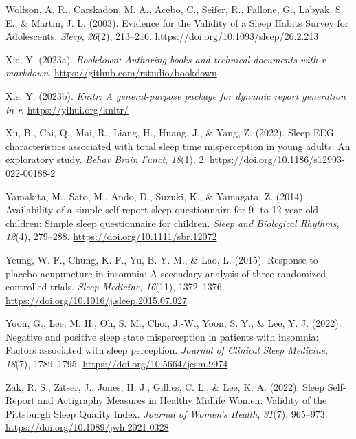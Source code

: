 \documentclass[
]{article}
\newlength{\cslhangindent}
\newenvironment{CSLReferences}[2] %
 {\begin{list}{}{%
  \setlength{\itemindent}{0pt}
  \setlength{\leftmargin}{0pt}
  \setlength{\parsep}{0pt}
  \ifodd #1
   \setlength{\leftmargin}{\cslhangindent}
   \setlength{\itemindent}{-1\cslhangindent}
  \fi
  \setlength{\itemsep}{#2\baselineskip}}}
 {\end{list}}
\begin{document}
\begin{CSLReferences}{1}{0}
Wolfson, A. R., Carskadon, M. A., Acebo, C., Seifer, R., Fallone, G., Labyak, S. E., \& Martin, J. L. (2003). Evidence for the {Validity} of a {Sleep} {Habits} {Survey} for {Adolescents}. \emph{Sleep}, \emph{26}(2), 213--216. \url{https://doi.org/10.1093/sleep/26.2.213}

Xie, Y. (2023a). \emph{Bookdown: Authoring books and technical documents with r markdown}. \url{https://github.com/rstudio/bookdown}

Xie, Y. (2023b). \emph{Knitr: A general-purpose package for dynamic report generation in r}. \url{https://yihui.org/knitr/}

Xu, B., Cai, Q., Mai, R., Liang, H., Huang, J., \& Yang, Z. (2022). Sleep {EEG} characteristics associated with total sleep time misperception in young adults: An exploratory study. \emph{Behav Brain Funct}, \emph{18}(1), 2. \url{https://doi.org/10.1186/s12993-022-00188-2}

Yamakita, M., Sato, M., Ando, D., Suzuki, K., \& Yamagata, Z. (2014). Availability of a simple self-report sleep questionnaire for 9- to 12-year-old children: {Simple} sleep questionnaire for children. \emph{Sleep and Biological Rhythms}, \emph{12}(4), 279--288. \url{https://doi.org/10.1111/sbr.12072}

Yeung, W.-F., Chung, K.-F., Yu, B. Y.-M., \& Lao, L. (2015). Response to placebo acupuncture in insomnia: A secondary analysis of three randomized controlled trials. \emph{Sleep Medicine}, \emph{16}(11), 1372--1376. \url{https://doi.org/10.1016/j.sleep.2015.07.027}

Yoon, G., Lee, M. H., Oh, S. M., Choi, J.-W., Yoon, S. Y., \& Lee, Y. J. (2022). Negative and positive sleep state misperception in patients with insomnia: Factors associated with sleep perception. \emph{Journal of Clinical Sleep Medicine}, \emph{18}(7), 1789--1795. \url{https://doi.org/10.5664/jcsm.9974}

Zak, R. S., Zitser, J., Jones, H. J., Gilliss, C. L., \& Lee, K. A. (2022). Sleep {Self}-{Report} and {Actigraphy} {Measures} in {Healthy} {Midlife} {Women}: {Validity} of the {Pittsburgh} {Sleep} {Quality} {Index}. \emph{Journal of Women's Health}, \emph{31}(7), 965--973. \url{https://doi.org/10.1089/jwh.2021.0328}


\end{CSLReferences}
\end{document}
